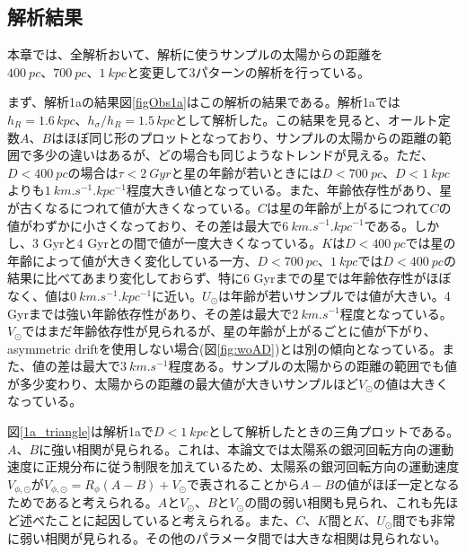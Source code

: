 \subsection{解析結果}
本章では、全解析おいて、解析に使うサンプルの太陽からの距離を$\SI{400}{pc}、\SI{700}{pc}、\SI{1}{kpc}$と変更して3パターンの解析を行っている。

まず、解析1aの結果図\ref{figObs1a}はこの解析の結果である。解析1aでは$h_R=1.6\,\si{kpc}、h_{\sigma}/h_R=1.5\,\si{kpc}$として解析した。この結果を見ると、オールト定数$A、B$はほぼ同じ形のプロットとなっており、サンプルの太陽からの距離の範囲で多少の違いはあるが、どの場合も同じようなトレンドが見える。ただ、$D<\SI{400}{pc}$の場合は$\tau<\SI{2}{Gyr}$と星の年齢が若いときには$D<\SI{700}{pc}、D<\SI{1}{kpc}$よりも$\SI{1}{km.s^{-1}.kpc^{-1}}$程度大きい値となっている。また、年齢依存性があり、星が古くなるにつれて値が大きくなっている。$C$は星の年齢が上がるにつれて$C$の値がわずかに小さくなっており、その差は最大で$\SI{6}{km.s^{-1}.kpc^{-1}}$である。しかし、3 Gyrと4 Gyrとの間で値が一度大きくなっている。$K$は$D<\SI{400}{pc}$では星の年齢によって値が大きく変化している一方、$D<\SI{700}{pc}、\SI{1}{kpc}$では$D<\SI{400}{pc}$の結果に比べてあまり変化しておらず、特に6 Gyrまでの星では年齢依存性がほぼなく、値は$\SI{0}{km.s^{-1}.kpc^{-1}}$に近い。$U_{\odot}$は年齢が若いサンプルでは値が大きい。4 Gyrまでは強い年齢依存性があり、その差は最大で$\SI{2}{km.s^{-1}}$程度となっている。$V_{\odot}$ではまだ年齢依存性が見られるが、星の年齢が上がるごとに値が下がり、asymmetric driftを使用しない場合(図\ref{fig:woAD})とは別の傾向となっている。また、値の差は最大で$\SI{3}{km.s^{-1}}$程度ある。サンプルの太陽からの距離の範囲でも値が多少変わり、太陽からの距離の最大値が大きいサンプルほど$V_{\odot}$の値は大きくなっている。

図\ref{1a_triangle}は解析1aで$D<\SI{1}{kpc}$として解析したときの三角プロットである。$A、B$に強い相関が見られる。これは、本論文では太陽系の銀河回転方向の運動速度に正規分布に従う制限を加えているため、太陽系の銀河回転方向の運動速度$V_{\phi,\odot}$が$V_{\phi,\odot}=R_{\phi}(A-B)+V_{\odot}$で表されることから$A-B$の値がほぼ一定となるためであると考えられる。$A$と$V_{\odot}$、$B$と$V_{\odot}$の間の弱い相関も見られ、これも先ほど述べたことに起因していると考えられる。また、$C、 K$間と$K、U_{\odot}$間でも非常に弱い相関が見られる。その他のパラメータ間では大きな相関は見られない。

